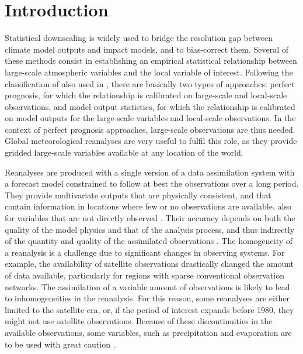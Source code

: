 \documentclass{ametsoc}
\begin{document}




\section{Introduction}

Statistical downscaling is widely used to bridge the resolution gap between climate model outputs and impact models, and to bias-correct them. Several of these methods consist in establishing an empirical statistical relationship between large-scale atmospheric variables and the local variable of interest. Following the classification of \citet{Rummukainen1997} also used in \citet{Maraun2010}, there are basically two types of approaches: perfect prognosis, for which the relationship is calibrated on large-scale and local-scale observations, and model output statistics, for which the relationship is calibrated on model outputs for the large-scale variables and local-scale observations. In the context of perfect prognosis approaches, large-scale observations are thus needed. Global meteorological reanalyses are very useful to fulfil this role, as they provide gridded large-scale variables available at any location of the world.

Reanalyses are produced with a single version of a data assimilation system with a forecast model constrained to follow at best the observations over a long period. They provide multivariate outputs that are physically consistent, and that contain information in locations where few or no observations are available, also for variables that are not directly observed \citep{Gelaro2017}. Their accuracy depends on both the quality of the model physics and that of the analysis process, and thus indirectly of the quantity and quality of the assimilated observations \citep{Dee2011a}. The homogeneity of a reanalysis is a challenge due to significant changes in observing systems. For example, the availability of satellite observations drastically changed the amount of data available, particularly for regions with sparse conventional observation networks. The assimilation of a variable amount of observations is likely to lead to inhomogeneities in the reanalysis. For this reason, some reanalyses are either limited to the satellite era, or, if the period of interest expands before 1980, they might not use satellite observations. Because of these discontinuities in the available observations, some variables, such as precipitation and evaporation are to be used with great caution \citep{Kobayashi2015}.
\end{document}
